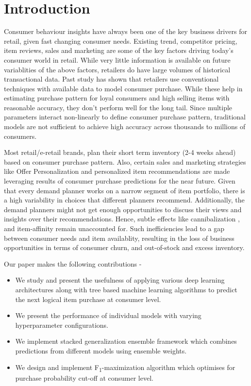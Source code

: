 \section{Introduction}
Consumer behaviour insights have always been one of the key business drivers for retail, given
fast changing consumer needs. Existing trend, competitor pricing, item reviews, sales and marketing are some of the 
key factors driving today's consumer world in retail. While very little information is available
on future variablities of the above factors, retailers do have large volumes of historical transactional data. Past study 
\cite{choudhury2019machine} has shown that retailers use conventional techniques with available data to model consumer purchase. 
While these help in estimating purchase pattern for loyal consumers and high selling items with reasonable accuracy, they 
don't perform well for the long tail. Since multiple parameters interact non-linearly to define consumer purchase pattern,
traditional models are not sufficient to achieve high accuracy across thousands to millions of consumers.

Most retail/e-retail brands, plan their short term inventory (2-4 weeks ahead)  based on consumer 
purchase pattern. Also, certain sales and marketing strategies like Offer Personalization and personalized item
recommendations are made leveraging results of consumer purchase predictions for the near future.
Given that every demand planner works on a narrow segment of item portfolio, there is a high 
variability in choices that different planners recommend. Additionally, the demand planners might not get enough opportunities 
to discuss their views and insights over their recommendations. Hence, subtle effects like cannibalization
\cite{shah2007retailer}, and item-affinity remain unaccounted for. Such inefficiencies lead to a gap between consumer needs 
and item availablity, resulting in the loss of business opportunities in terms of consumer churn, and out-of-stock
and excess inventory.

Our paper makes the following contributions -
\begin{itemize}
\item We study and present the usefulness of applying various deep learning architectures along with tree based machine 
learning algorithms to predict the next logical item purchase at consumer level.
\item We present the performance of individual models with varying hyperparameter configurations.
\item We implement stacked generalization ensemble framework \cite{wolpert1992stacked} 
which combines predictions from different models using ensemble weights.
\item We design and implement F\textsubscript{1}-maximization algorithm which optimises for purchase probability cut-off 
at consumer level.
\end{itemize}
